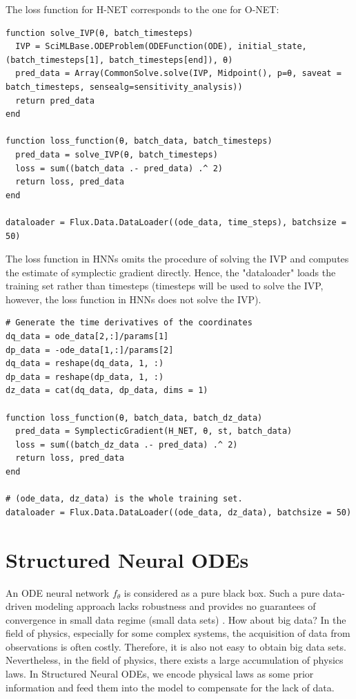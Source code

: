 \documentclass[
	parskip, 			   %
	twoside, 			   %
	DIV=14, 			   %
	BCOR=15.0mm, 		   %
	headsepline, 		   %
	open=right, 		   %
	captions=tableheading, %
	bibliography=totoc,    %
	numbers=noenddot       %
]{scrreprt}
\begin{document}
The loss function for H-NET corresponds to the one for O-NET:

\begin{verbatim}
function solve_IVP(θ, batch_timesteps)
  IVP = SciMLBase.ODEProblem(ODEFunction(ODE), initial_state, (batch_timesteps[1], batch_timesteps[end]), θ)
  pred_data = Array(CommonSolve.solve(IVP, Midpoint(), p=θ, saveat = batch_timesteps, sensealg=sensitivity_analysis))
  return pred_data
end

function loss_function(θ, batch_data, batch_timesteps)
  pred_data = solve_IVP(θ, batch_timesteps)
  loss = sum((batch_data .- pred_data) .^ 2)
  return loss, pred_data
end

dataloader = Flux.Data.DataLoader((ode_data, time_steps), batchsize = 50)
\end{verbatim}

The loss function in HNNs omits the procedure of solving the IVP and computes the estimate of symplectic gradient directly. Hence, the "dataloader" loads the training set rather than timesteps (timesteps will be used to solve the IVP, however, the loss function in HNNs does not solve the IVP).

\begin{verbatim}
# Generate the time derivatives of the coordinates
dq_data = ode_data[2,:]/params[1]
dp_data = -ode_data[1,:]/params[2]
dq_data = reshape(dq_data, 1, :)
dp_data = reshape(dp_data, 1, :)
dz_data = cat(dq_data, dp_data, dims = 1)

function loss_function(θ, batch_data, batch_dz_data)
  pred_data = SymplecticGradient(H_NET, θ, st, batch_data)
  loss = sum((batch_dz_data .- pred_data) .^ 2)
  return loss, pred_data
end

# (ode_data, dz_data) is the whole training set.
dataloader = Flux.Data.DataLoader((ode_data, dz_data), batchsize = 50)
\end{verbatim}

\section{Structured Neural ODEs}
An ODE neural network $f_{\theta}$ is considered as a pure black box. Such a pure data-driven modeling approach lacks robustness and provides no guarantees of convergence in small data regime (small data sets) \cite{raissi2017physics}. How about big data? In the field of physics, especially for some complex systems, the acquisition of data from observations is often costly. Therefore, it is also not easy to obtain big data sets. Nevertheless, in the field of physics, there exists a large accumulation of physics laws. In Structured Neural ODEs, we encode physical laws as some prior information and feed them into the model to compensate for the lack of data.
\end{document}
